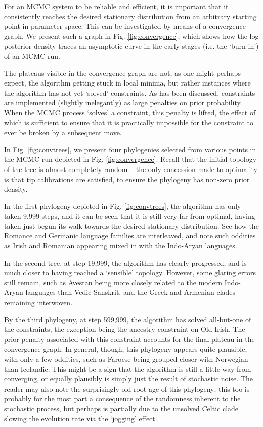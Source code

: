 \documentclass[10pt,journal,compsoc]{IEEEtran}
\begin{document}
For an MCMC system to be reliable and efficient, it is important that it consistently reaches the desired stationary distribution from an arbitrary starting point in parameter space. This can be investigated by means of a convergence graph. We present such a graph in Fig. \ref{fig:convergence}, which shows how the log posterior density traces an asymptotic curve in the early stages (i.e. the `burn-in') of an MCMC run.

The plateaus visible in the convergence graph are not, as one might perhaps expect, the algorithm getting stuck in local minima, but rather instances where the algorithm has not yet `solved' constraints. As has been discussed, constraints are implemented (slightly inelegantly) as large penalties on prior probability. When the MCMC process `solves' a constraint, this penalty is lifted, the effect of which is sufficient to ensure that it is practically impossible for the constraint to ever be broken by a subsequent move.

In Fig. \ref{fig:convtrees}, we present four phylogenies selected from various points in the MCMC run depicted in Fig. \ref{fig:convergence}. Recall that the initial topology of the tree is almost completely random -- the only concession made to optimality is that tip calibrations are satisfied, to ensure the phylogeny has non-zero prior density.

In the first phylogeny depicted in Fig. \ref{fig:convtrees}, the algorithm has only taken 9,999 steps, and it can be seen that it is still very far from optimal, having taken just begun its walk towards the desired stationary distribution. See how the Romance and Germanic language families are interleaved, and note such oddities as Irish and Romanian appearing mixed in with the Indo-Aryan languages.

In the second tree, at step 19,999, the algorithm has clearly progressed, and is much closer to having reached a `sensible' topology. However, some glaring errors still remain, such as Avestan being more closely related to the modern Indo-Aryan languages than Vedic Sanskrit, and the Greek and Armenian clades remaining interwoven.

By the third phylogeny, at step 599,999, the algorithm has solved all-but-one of the constraints, the exception being the ancestry constraint on Old Irish. The prior penalty associated with this constraint accounts for the final plateau in the convergence graph. In general, though, this phylogeny appears quite plausible, with only a few oddities, such as Faroese being grouped closer with Norwegian than Icelandic. This might be a sign that the algorithm is still a little way from converging, or equally plausibly is simply just the result of stochastic noise. The reader may also note the surprisingly old root age of this phylogeny; this too is probably for the most part a consequence of the randomness inherent to the stochastic process, but perhaps is partially due to the unsolved Celtic clade slowing the evolution rate via the `jogging' effect.
\end{document}
